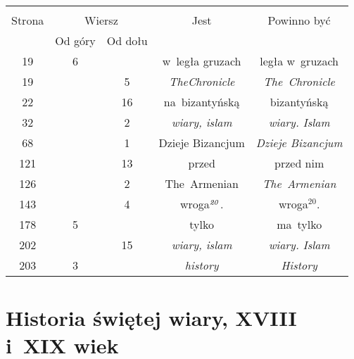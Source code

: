 \documentclass[a4paper,11pt]{article}
\begin{document}

\begin{center}

  \begin{tabular}{|c|c|c|c|c|}
    \hline
    & \multicolumn{2}{c|}{} & & \\
    Strona & \multicolumn{2}{c|}{Wiersz} & Jest
                              & Powinno być \\ \cline{2-3}
    & Od góry & Od dołu & & \\
    \hline
    19  &  6 & & w~legła gruzach & legła w~gruzach \\
    19  & &  5 & \emph{TheChronicle} & \emph{The~Chronicle} \\
    22  & & 16 & na~bizantyńską & bizantyńską \\
    32  & &  2 & \emph{wiary, islam} & \emph{wiary. Islam} \\
    68  & &  1 & Dzieje Bizancjum & \emph{Dzieje Bizancjum} \\
    121 & & 13 & przed & przed nim \\
    126 & &  2 & The~Armenian & \emph{The~Armenian} \\
    143 & &  4 & wroga$^{ \textrm{\emph{20}} }$. & wroga$^{ 20 }$. \\
    178 &  5 & & tylko & ma~tylko \\
    202 & & 15 & \emph{wiary, islam} & \emph{wiary. Islam} \\
    203 &  3 & & \emph{history} & \emph{History} \\
    \hline
  \end{tabular}

\end{center}

\vspace{\spaceTwo}










\section{Historia świętej wiary, XVIII i~XIX wiek}

\vspace{\spaceTwo}



\end{document}
